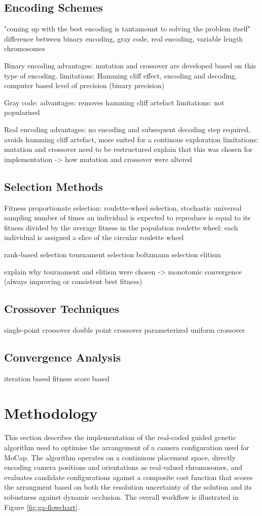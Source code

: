 \subsection{Encoding Schemes}
"coming up with the best encoding is tantamount to solving the problem itself"
difference between binary encoding, gray code, real encoding, variable length chromosomes

Binary encoding
advantages: mutation and crossover are developed based on this type of encoding.
limitations: Hamming cliff effect, encoding and decoding, computer based level of precision (binary precision) 

Gray code:
advantages: removes hamming cliff artefact
limitations: not popularised 

Real encoding
advantages: no encoding and subsequent decoding step required, avoids hamming cliff artefact, more suited for a continous exploration
limitations: mutation and crossover need to be restructured  
explain that this was chosen for implementation -> how mutation and crossover were altered 

\subsection{Selection Methods}
Fitness proportionate selection: roulette-wheel selection, stochastic universal sampling
number of times an individual is expected to reproduce is equal to its fitness divided by the average fitness in the population 
roulette wheel: each individual is assigned a slice of the circular roulette wheel 


rank-based selection
tournament selection
boltzmann selection
elitism

explain why tournament and elitism were chosen -> monotomic convergence (always improving or consistent best fitness)

\subsection{Crossover Techniques}
single-point crossover
double point crossover
parameterized uniform crossover

\subsection{Convergence Analysis}
iteration based
fitness score based 


\section{Methodology}
\label{sec:methodology}
This section describes the implementation of the real-coded guided genetic algorithm used to optimise the arrangement of a camera configuration used for \gls{MoCap}. The algorithm operates on a continuous placement space, directly encoding camera positions and orientations as real-valued chromosomes, and evaluates candidate configurations against a composite cost function that scores the arrangment based on both the resolution uncertainty of the solution and its robustness against dynamic occlusion. The overall workflow is illustrated in Figure \ref{fig:ga-flowchart}.


